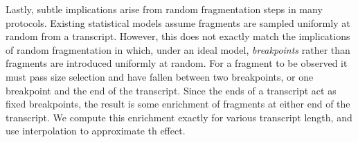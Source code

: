 \documentclass[twocolumn]{article}
\begin{document}
Lastly, subtle implications arise from random fragmentation steps in many
protocols. Existing statistical models assume fragments are sampled uniformly
at random from a transcript. However, this does not exactly match the
implications of random fragmentation in which, under an ideal model,
\emph{breakpoints} rather than fragments are introduced uniformly at random. For
a fragment to be observed it must pass size selection and have fallen between
two breakpoints, or one breakpoint and the end of the transcript. Since the ends
of a transcript act as fixed breakpoints, the result is some enrichment of
fragments at either end of the transcript. We compute this enrichment exactly
for various transcript length, and use interpolation to approximate th effect.



\end{document}

